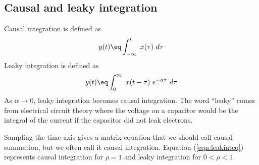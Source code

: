 
\subsection{Causal and leaky integration}
Causal integration is defined as
\begin{equation}
y(t) \eq \int_{-\infty}^t \ x(\tau )\ d\tau 
\end{equation}
Leaky integration is defined as
\begin{equation}
y(t) \eq \int_0^\infty \ x(t-\tau)\ e^{-\alpha\tau} \ d\tau
\end{equation}
As $\alpha \rightarrow 0$, leaky integration becomes causal integration.
The word ``leaky'' comes from electrical circuit theory
where the voltage on a capacitor would be the integral of the current
if the capacitor did not leak electrons.

\par
Sampling the time axis gives a matrix equation that
we should call causal summation,
but we often call it causal integration.
Equation (\ref{eqn:leakinteq}) represents causal integration for $\rho=1$
and leaky integration for $0<\rho <1$.

